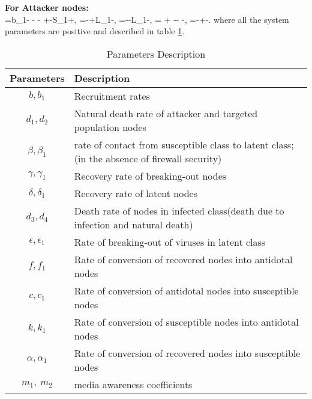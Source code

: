 \textbf{For Attacker nodes:}\\
\be
{}=b_1- - - +-S_1+,
\ee
\be
{}=-+L_1-,
\ee
\be
{}=--L_1-,
\ee
\be
{}=  + -- -,
\ee
\be
{}=-+-.
\ee
where all the system parameters are positive and described in table \ref{table1}. 
\begin{center}
\begin{table}
\caption{Parameters Description}
\scriptsize
\begin{tabular}{|c|l|}
  \hline
  \textbf{Parameters} & \textbf{Description }\\
  \hline
  $b,b_1$ & Recruitment rates\\
  \hline
  $d_1,d_2$ & Natural death rate of attacker and targeted population nodes\\
  \hline
  $\beta,\beta_1$ & rate of contact from susceptible class to latent class;(in the absence of firewall security) \\
  \hline
  $\gamma,\gamma_1$ & Recovery rate of breaking-out nodes \\
  \hline
  $\delta,\delta_1$ & Recovery rate of latent nodes\\
  \hline
  $d_3,d_4$ & Death rate of nodes in infected class(death due to infection and natural death) \\
  \hline
  $\epsilon,\epsilon_1$& Rate of breaking-out of viruses in latent class\\
  \hline
  $f,f_1$ & Rate of conversion of recovered nodes into antidotal nodes \\
  \hline
  $c,c_1$ & Rate of conversion of antidotal nodes into susceptible nodes \\
  \hline
  $k,k_1$ & Rate of conversion of susceptible nodes into antidotal nodes \\
  \hline
  $\alpha,\alpha_1$ & Rate of conversion of recovered nodes into susceptible nodes \\
  \hline
  $m_1, \ m_2$ & media awareness coefficients\\
  \hline
\end{tabular}  \label{table1}
\end{table}
\end{center}


